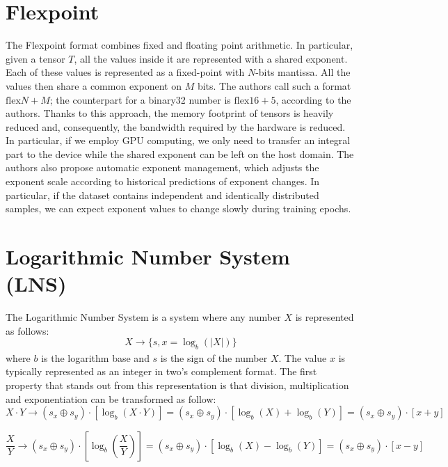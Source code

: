 \section{Flexpoint}
The Flexpoint format \cite{koster2017flexpoint,popescu2018flexpoint} combines fixed and floating point arithmetic. In particular, given a tensor $T$, all the values inside it are represented with a shared exponent. Each of these values is represented as a fixed-point with $N$-bits mantissa. All the values then share a common exponent on $M$ bits. The authors call such a format $\text{flex}N+M$; the counterpart for a binary32 number is $\text{flex}16+5$, according to the authors.
Thanks to this approach, the memory footprint of tensors is heavily reduced and, consequently, the bandwidth required by the hardware is reduced. In particular, if we employ GPU computing, we only need to transfer an integral part to the device while the shared exponent can be left on the host domain. 
The authors also propose automatic exponent management, which adjusts the exponent scale according to historical predictions of exponent changes. In particular, if the dataset contains independent and identically distributed samples, we can expect exponent values to change slowly during training epochs.

\section{Logarithmic Number System (LNS)}

The Logarithmic Number System \cite{johnson2018rethink} is a system where any number $X$ is represented as follows:
\begin{equation}\label{eqn:logNumSysSet}
    X \xrightarrow[]{}\{ s,x = \log_b(\left| X \right|) \}
\end{equation} where $b$ is the logarithm base and $s$ is the sign of the number $X$. The value $x$ is typically represented as an integer in two's complement format.
The first property that stands out from this representation is that division, multiplication and exponentiation can be transformed as follow:
\begin{equation}
    X\cdot Y \xrightarrow[]{} (s_x \oplus s_y)\cdot \left[ \log_b(X \cdot Y) \right] = (s_x \oplus s_y)\cdot \left[ \log_b(X) +  \log_b(Y) \right] = (s_x \oplus s_y)\cdot \left[ x+y \right]
\end{equation}

\begin{equation}
    \frac{X}{Y} \xrightarrow[]{} (s_x \oplus s_y)\cdot \left[ \log_b\left(\frac{X}{Y}\right) \right] = (s_x \oplus s_y)\cdot \left[ \log_b(X) -  \log_b(Y) \right] = (s_x \oplus s_y)\cdot \left[ x-y \right]
\end{equation}

